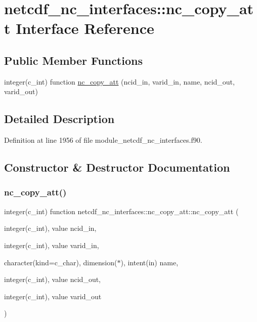 \hypertarget{interfacenetcdf__nc__interfaces_1_1nc__copy__att}{}\section{netcdf\+\_\+nc\+\_\+interfaces\+:\+:nc\+\_\+copy\+\_\+att Interface Reference}
\label{interfacenetcdf__nc__interfaces_1_1nc__copy__att}
\subsection*{Public Member Functions}
\begin{DoxyCompactItemize}
\item 
integer(c\+\_\+int) function \hyperlink{interfacenetcdf__nc__interfaces_1_1nc__copy__att_a5a6862dafd68b4d89aa5b780d174fb01}{nc\+\_\+copy\+\_\+att} (ncid\+\_\+in, varid\+\_\+in, name, ncid\+\_\+out, varid\+\_\+out)
\end{DoxyCompactItemize}


\subsection{Detailed Description}


Definition at line 1956 of file module\+\_\+netcdf\+\_\+nc\+\_\+interfaces.\+f90.



\subsection{Constructor \& Destructor Documentation}
\mbox{\label{interfacenetcdf__nc__interfaces_1_1nc__copy__att_a5a6862dafd68b4d89aa5b780d174fb01}} 
\subsubsection{\texorpdfstring{nc\+\_\+copy\+\_\+att()}{nc\_copy\_att()}}
{\footnotesize\ttfamily integer(c\+\_\+int) function netcdf\+\_\+nc\+\_\+interfaces\+::nc\+\_\+copy\+\_\+att\+::nc\+\_\+copy\+\_\+att (\begin{DoxyParamCaption}\item[{integer(c\+\_\+int), value}]{ncid\+\_\+in,  }\item[{integer(c\+\_\+int), value}]{varid\+\_\+in,  }\item[{character(kind=c\+\_\+char), dimension($\ast$), intent(in)}]{name,  }\item[{integer(c\+\_\+int), value}]{ncid\+\_\+out,  }\item[{integer(c\+\_\+int), value}]{varid\+\_\+out }\end{DoxyParamCaption})}



